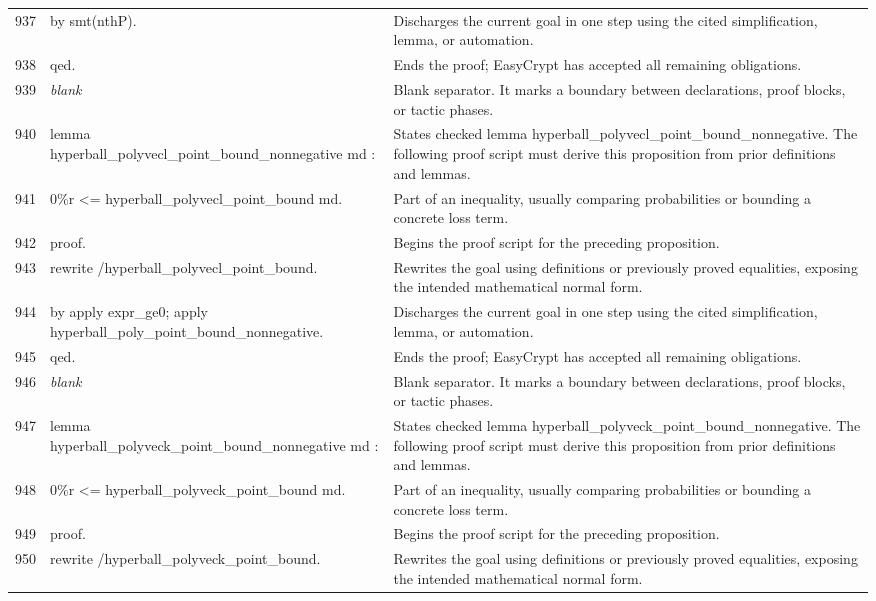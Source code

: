 \documentclass[10pt]{article}
\begin{document}
\begin{longtable}{r L{0.53\textwidth} L{0.37\textwidth}}
937 & {\ttfamily\scriptsize by smt(nthP).} & Discharges the current goal in one step using the cited simplification, lemma, or automation. \\
938 & {\ttfamily\scriptsize qed.} & Ends the proof; EasyCrypt has accepted all remaining obligations. \\
939 & {\ttfamily\scriptsize \emph{blank}} & Blank separator.  It marks a boundary between declarations, proof blocks, or tactic phases. \\
940 & {\ttfamily\scriptsize lemma hyperball\_polyvecl\_point\_bound\_nonnegative md :} & States checked lemma hyperball\_polyvecl\_point\_bound\_nonnegative.  The following proof script must derive this proposition from prior definitions and lemmas. \\
941 & {\ttfamily\scriptsize   0\%r <= hyperball\_polyvecl\_point\_bound md.} & Part of an inequality, usually comparing probabilities or bounding a concrete loss term. \\
942 & {\ttfamily\scriptsize proof.} & Begins the proof script for the preceding proposition. \\
943 & {\ttfamily\scriptsize rewrite /hyperball\_polyvecl\_point\_bound.} & Rewrites the goal using definitions or previously proved equalities, exposing the intended mathematical normal form. \\
944 & {\ttfamily\scriptsize by apply expr\_ge0; apply hyperball\_poly\_point\_bound\_nonnegative.} & Discharges the current goal in one step using the cited simplification, lemma, or automation. \\
945 & {\ttfamily\scriptsize qed.} & Ends the proof; EasyCrypt has accepted all remaining obligations. \\
946 & {\ttfamily\scriptsize \emph{blank}} & Blank separator.  It marks a boundary between declarations, proof blocks, or tactic phases. \\
947 & {\ttfamily\scriptsize lemma hyperball\_polyveck\_point\_bound\_nonnegative md :} & States checked lemma hyperball\_polyveck\_point\_bound\_nonnegative.  The following proof script must derive this proposition from prior definitions and lemmas. \\
948 & {\ttfamily\scriptsize   0\%r <= hyperball\_polyveck\_point\_bound md.} & Part of an inequality, usually comparing probabilities or bounding a concrete loss term. \\
949 & {\ttfamily\scriptsize proof.} & Begins the proof script for the preceding proposition. \\
950 & {\ttfamily\scriptsize rewrite /hyperball\_polyveck\_point\_bound.} & Rewrites the goal using definitions or previously proved equalities, exposing the intended mathematical normal form. \\

\end{longtable}
\end{document}
